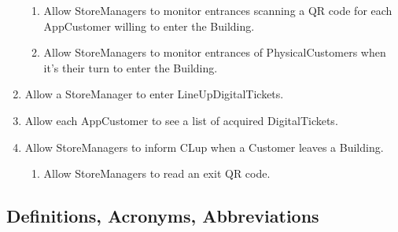 \documentclass{article}
\begin{document}
\begin{enumerate}
		\renewcommand{\labelenumii}{\theenumii}
		\renewcommand{\theenumi}{G\,\arabic{enumi}}
		\renewcommand{\theenumii}{[\theenumi.\arabic{enumii}].}
		\begin{enumerate}
			\item Allow StoreManagers to monitor entrances scanning a QR code for each AppCustomer willing to enter the Building.
			\item Allow StoreManagers to monitor entrances of PhysicalCustomers when it’s their turn to enter the Building.
		\end{enumerate}
		\renewcommand{\theenumi}{[G\,\arabic{enumi}]}
		\item Allow a StoreManager to enter LineUpDigitalTickets.
		\item Allow each AppCustomer to see a list of acquired DigitalTickets.
		\item Allow StoreManagers to inform CLup when a Customer leaves a Building.
		\renewcommand{\labelenumii}{\theenumii}
		\renewcommand{\theenumi}{G\,\arabic{enumi}}
		\renewcommand{\theenumii}{[\theenumi.\arabic{enumii}].}
		\begin{enumerate}
			\item Allow StoreManagers to read an exit QR code.
		\end{enumerate}
	\end{enumerate}
         
         \subsection{Definitions, Acronyms, Abbreviations}
\end{document}
